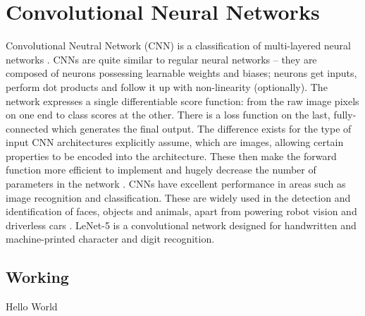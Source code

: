 \chapter{Convolutional Neural Networks}
\label{ch5_cnn}

Convolutional Neutral Network (CNN) is a classification of multi-layered neural networks \cite{cnn_lecun_lenet5}. CNNs are quite similar to regular neural networks – they are composed of neurons possessing learnable weights and biases; neurons get inputs, perform dot products and follow it up with non-linearity (optionally). The network expresses a single differentiable score function: from the raw image pixels on one end to class scores at the other. There is a loss function on the last, fully-connected which generates the final output. The difference exists for the type of input CNN architectures explicitly assume, which are images, allowing certain properties to be encoded into the architecture. These then make the forward function more efficient to implement and hugely decrease the number of parameters in the network \cite{cnn_stanford}. \newline\newline
CNNs have excellent performance in areas such as image recognition and classification. These are widely used in the detection and identification of faces, objects and animals, apart from powering robot vision and driverless cars \cite{cnn_karn}. LeNet-5 is a convolutional network designed for handwritten and machine-printed character and digit recognition.

\section{Working}
\label{sect5_1}
Hello World

